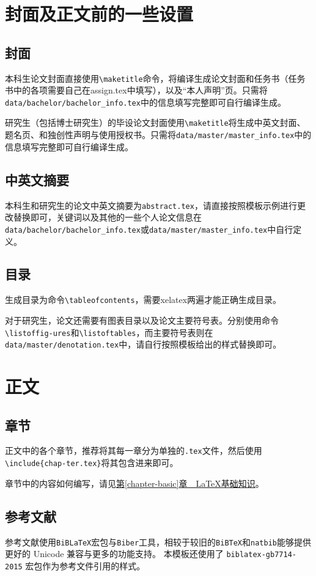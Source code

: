 \section{封面及正文前的一些设置}
\subsection{封面}
本科生论文封面直接使用\texttt{\textbackslash maketitle}命令，将编译生成论文封面和任务书（任务书中的各项需要自己在assign.tex中填写），以及“本人声明”页。只需将\texttt{data/bachelor/bachelor\_info.tex}中的信息填写完整即可自行编译生成。

研究生（包括博士研究生）的毕设论文封面使用\texttt{\textbackslash maketitle}将生成中英文封面、题名页、和独创性声明与使用授权书。只需将\texttt{data/master/master\_info.tex}中的信息填写完整即可自行编译生成。

\subsection{中英文摘要}
本科生和研究生的论文中英文摘要为\texttt{abstract.tex}，请直接按照模板示例进行更改替换即可，关键词以及其他的一些个人论文信息在\texttt{data/bachelor/bachelor\_info.tex}或\texttt{data/master/master\_info.tex}中自行定义。

\subsection{目录}
生成目录为命令\texttt{\textbackslash tableofcontents}，需要xelatex两遍才能正确生成目录。

对于研究生，论文还需要有图表目录以及论文主要符号表。分别使用命令\texttt{\textbackslash listoffig\hyp{}ures}和\texttt{\textbackslash listoftables}，而主要符号表则在\texttt{data/master/denotation.tex}中，请自行按照模板给出的样式替换即可。

\section{正文}
\subsection{章节}
正文中的各个章节，推荐将其每一章分为单独的\texttt{.tex}文件，然后使用\texttt{\textbackslash include\{chap\hyp{}ter.tex\}}将其包含进来即可。

章节中的内容如何编写，请见\hyperref[chapter-basic]{第\ref{chapter-basic}章~~\LaTeX{}基础知识}。

\subsection{参考文献}
参考文献使用\verb|BiBLaTeX|宏包与\verb|Biber|工具，相较于较旧的\verb|BiBTeX|和\verb|natbib|能够提供更好的 Unicode 兼容与更多的功能支持。
本模板还使用了 \verb|biblatex-gb7714-2015| 宏包作为参考文件引用的样式。


